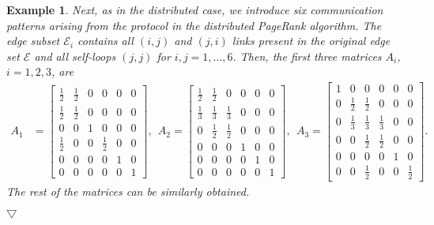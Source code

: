 \documentclass[11pt,draftcls,onecolumn]{IEEEtran}
\newtheorem{example}[theorem]{Example}
\newcommand{\End}{\hfill \mbox{$\bigtriangledown$}}
\begin{document}
\begin{example}
Next, as in the distributed case, we introduce six communication patterns 
arising from the protocol in the distributed PageRank algorithm.
The edge subset $\mathcal{E}_i$ contains all $(i,j)$ and $(j,i)$
links present in the original edge set $\mathcal{E}$ and all self-loops $(j,j)$ for $i,j=1,\dots,6$.
Then, the first three matrices $A_i$, $i=1,2,3$, are
\begin{align*}
 A_1 
  &= \begin{bmatrix}
       \frac{1}{2} & \frac{1}{2} & 0           & 0           & 0           & 0           \\
       \frac{1}{2} & \frac{1}{2} & 0           & 0           & 0           & 0           \\
       0           & 0           & 1           & 0           & 0           & 0           \\
       \frac{1}{2} & 0           & 0           & \frac{1}{2} & 0           & 0           \\
       0           & 0           & 0           & 0           & 1           & 0           \\
       0           & 0           & 0           & 0           & 0           & 1
     \end{bmatrix},~~
 A_2
   = \begin{bmatrix}
       \frac{1}{2} & \frac{1}{2} & 0           & 0           & 0           & 0           \\
       \frac{1}{3} & \frac{1}{3} & \frac{1}{3} & 0           & 0           & 0           \\
       0           & \frac{1}{2} & \frac{1}{2} & 0           & 0           & 0           \\
       0           & 0           & 0           & 1 & 0 & 0\\
       0           & 0           & 0           & 0 & 1 & 0\\
       0           & 0           & 0           & 0 & 0 & 1
     \end{bmatrix},~~
 A_3
   = \begin{bmatrix}
       1 & 0           & 0           & 0           & 0           & 0           \\
       0 & \frac{1}{2} & \frac{1}{2} & 0           & 0           & 0           \\
       0 & \frac{1}{3} & \frac{1}{3} & \frac{1}{3} & 0           & 0           \\
       0 & 0           & \frac{1}{2} & \frac{1}{2} & 0           & 0           \\
       0 & 0           & 0           & 0           & 1           & 0           \\
       0 & 0           & \frac{1}{2} & 0           & 0           & \frac{1}{2} 
     \end{bmatrix}.
\end{align*}
The rest of the matrices can be similarly obtained.

\End
\end{example}
\end{document}
